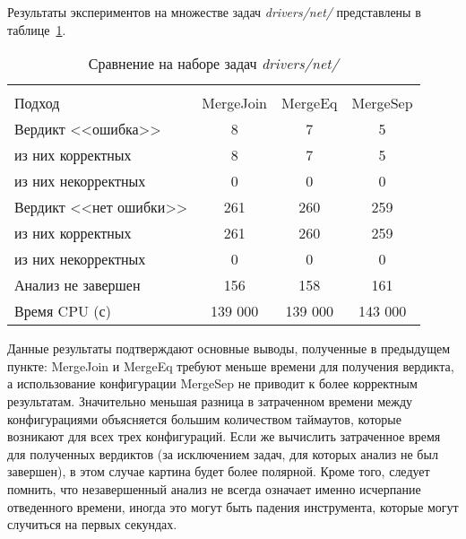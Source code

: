 Результаты экспериментов на множестве задач \textit{drivers/net/} представлены в таблице~\ref{table-drivers-merge}.

  \begin{table}[h]\footnotesize \centering
    \caption{Сравнение на наборе задач \textit{drivers/net/}}
  	\label{table-drivers-merge}
    \begin{tabular}{ | l | c | c | c | }
      \hline
      		& 		\multicolumn{3}{c|}{\theoryraces}  \\
      Подход         				& MergeJoin	& MergeEq 	& MergeSep   \\ \hline
      Вердикт <<ошибка>> 			& 8	    	& 7  		& 5         \\ 
  \hspace{0.5cm} из них корректных 	& 8 		& 7 		& 5      \\ 
  \hspace{0.5cm} из них некорректных & 0 		& 0 		& 0        \\ \hline
      Вердикт <<нет ошибки>>  		& 261      	& 260       & 259       \\ 
  \hspace{0.5cm} из них корректных 	& 261 		& 260    	& 259        \\
  \hspace{0.5cm} из них некорректных & 0 		& 0    		& 0         \\ \hline
      Анализ не завершен       		& 156     	& 158       & 161       \\ \hline
      Время CPU (с)   				& 139 000 	& 139 000   & 143 000    \\ 
      \hline
    \end{tabular}
  \end{table}

Данные результаты подтверждают основные выводы, полученные в предыдущем пункте: MergeJoin и MergeEq требуют меньше времени для получения вердикта, а использование конфигурации MergeSep не приводит к более корректным результатам. 
Значительно меньшая разница в затраченном времени между конфигурациями объясняется большим количеством таймаутов, которые возникают для всех трех конфигураций. 
Если же вычислить затраченное время для полученных вердиктов (за исключением задач, для которых анализ не был завершен), в этом случае картина будет более полярной.
Кроме того, следует помнить, что незавершенный анализ не всегда означает именно исчерпание отведенного времени, иногда это могут быть падения инструмента, которые могут случиться на первых секундах.

